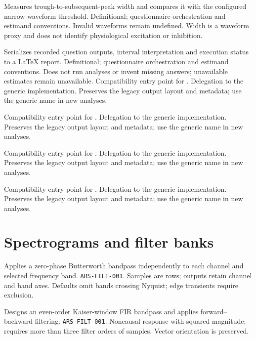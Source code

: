 {Measures trough-to-subsequent-peak width and compares it with the configured narrow-waveform threshold.}
{Definitional; questionnaire orchestration and estimand conventions.}
{Invalid waveforms remain undefined. Width is a waveform proxy and does not identify physiological excitation or inhibition.}

{Serializes recorded question outputs, interval interpretation and execution status to a LaTeX report.}
{Definitional; questionnaire orchestration and estimand conventions.}
{Does not run analyses or invent missing answers; unavailable estimates remain unavailable.}
{Compatibility entry point for .}
{Delegation to the generic implementation.}
{Preserves the legacy output layout and metadata; use the generic name in new analyses.}

{Compatibility entry point for .}
{Delegation to the generic implementation.}
{Preserves the legacy output layout and metadata; use the generic name in new analyses.}

{Compatibility entry point for .}
{Delegation to the generic implementation.}
{Preserves the legacy output layout and metadata; use the generic name in new analyses.}

{Compatibility entry point for .}
{Delegation to the generic implementation.}
{Preserves the legacy output layout and metadata; use the generic name in new analyses.}

\section{Spectrograms and filter banks}
{Applies a zero-phase Butterworth bandpass independently to each channel and selected frequency band.}
{\texttt{ARS-FILT-001}.}
{Samples are rows; outputs retain channel and band axes. Defaults omit bands crossing Nyquist; edge transients require exclusion.}

{Designs an even-order Kaiser-window FIR bandpass and applies forward--backward filtering.}
{\texttt{ARS-FILT-001}.}
{Noncausal response with squared magnitude; requires more than three filter orders of samples. Vector orientation is preserved.}

